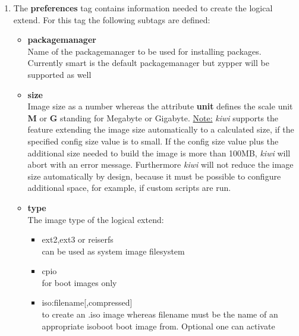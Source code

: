 \begin{itemize}
      \begin{enumerate}
          \item The \textbf{preferences} tag contains information needed to
          create the logical extend. For this tag the following subtags
          are defined:
          \begin{itemize}
              \item \textbf{packagemanager}\\
                    Name of the packagemanager to be used for installing
                    packages. Currently smart is the default packagemanager
                    but zypper will be supported as well
              \item \textbf{size}\\
                    Image size as a number whereas the attribute
                    \textbf{unit} defines the scale unit \textbf{M} or
                    \textbf{G} standing for Megabyte or Gigabyte.
                    \underline{Note:}
                    \textit{kiwi} supports the feature extending the image size
                    automatically to a calculated size, if the specified
                    config size value is to small. If the config size value
                    plus the additional size needed to build the image is more
                    than 100MB, \textit{kiwi} will abort with an error message.
                    Furthermore \textit{kiwi} will not reduce the image size
                    automatically by design, because it must be possible to
                    configure additional space, for example, if custom scripts
                    are run.
              \item \textbf{type}\\
                    The image type of the logical extend:
					\begin{itemize}
						\item ext2,ext3 or reiserfs\\
                              can be used as system image filesystem
						\item cpio\\
                              for boot images only
                        \item iso:filename[,compressed]\\
                              to create an .iso image whereas filename
                              must be the name of an appropriate isoboot
                              boot image from. Optional one can activate

\end{itemize}
\end{itemize}
\end{enumerate}
\end{itemize}
